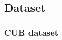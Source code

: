 \documentclass[final-report]{report-template}
\begin{document}








\newpage

\subsection{Dataset}
\subsubsection{CUB dataset} \label{sec:cubdataset}
\end{document}

